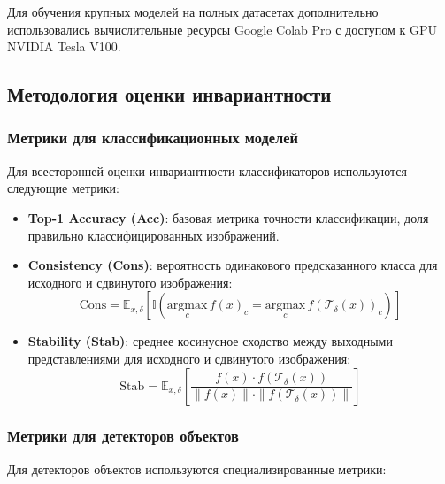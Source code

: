 Для обучения крупных моделей на полных датасетах дополнительно использовались вычислительные ресурсы Google Colab Pro с доступом к GPU NVIDIA Tesla V100.

\subsection{Методология оценки инвариантности}
\label{sec:evaluation}

\subsubsection{Метрики для классификационных моделей}
\label{sec:evaluation:classification}

Для всесторонней оценки инвариантности классификаторов используются следующие метрики:

\begin{itemize}
    \item \textbf{Top-1 Accuracy (Acc)}: базовая метрика точности классификации, доля правильно классифицированных изображений.
    
    \item \textbf{Consistency (Cons)}: вероятность одинакового предсказанного класса для исходного и сдвинутого изображения:
    \begin{equation}
    \text{Cons} = \mathbb{E}_{x, \delta} \left[ \mathbb{I} \left( \underset{c}{\text{argmax}} \, f(x)_c = \underset{c}{\text{argmax}} \, f(\mathcal{T}_\delta(x))_c \right) \right]
    \end{equation}
    
    \item \textbf{Stability (Stab)}: среднее косинусное сходство между выходными представлениями для исходного и сдвинутого изображения:
    \begin{equation}
    \text{Stab} = \mathbb{E}_{x, \delta} \left[ \frac{f(x) \cdot f(\mathcal{T}_\delta(x))}{\|f(x)\| \cdot \|f(\mathcal{T}_\delta(x))\|} \right]
    \end{equation}
\end{itemize}

\subsubsection{Метрики для детекторов объектов}
\label{sec:evaluation:detection}

Для детекторов объектов используются специализированные метрики:

